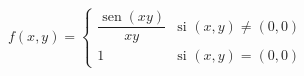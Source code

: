 \item $f(x,y) = \begin{cases} \dfrac{\operatorname{sen}(xy)}{xy} & \text{si } (x,y) \neq (0,0) \\ 1 & \text{si } (x,y) = (0,0) \end{cases}$
